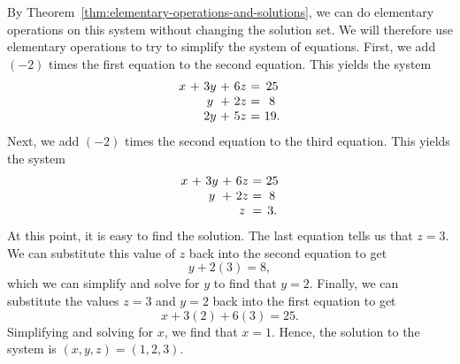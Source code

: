 \begin{solution}
  By Theorem~\ref{thm:elementary-operations-and-solutions}, we can do
  elementary operations on this system without changing the solution
  set. We will therefore use elementary operations to try to simplify
  the system of equations.  First, we add $(-2)$ times the
  first equation to the second equation. This yields the system
  \begin{equation*}
    \begin{array}{c@{~}c@{~}c@{~}c@{~}c@{~}c@{~}c}
      x&+&3y&+&6z&=&25 \\
       &&y&+&2z&=&8 \\
       &&2y&+&5z&=&19.
    \end{array}
    \label{solving-a-system2}
  \end{equation*}
  Next, we add $(-2)$ times the second equation to the
  third equation. This yields the system
  \begin{equation}\label{solving-a-system3}
    \begin{array}{c@{~}c@{~}c@{~}c@{~}c@{~}c@{~}c}
      x&+&3y&+&6z&=&25 \\
       &&y&+&2z&=&8 \\
       &&&&z&=&3.
    \end{array}
  \end{equation}
  At this point, it is easy to find the solution. The last equation
  tells us that $z=3$. We can substitute this value of $z$ back into
  the second equation to get
  \begin{equation*}
    y+2(3)=8,
  \end{equation*}
  which we can simplify and solve for $y$ to find that $y=2$. Finally,
  we can substitute the values $z=3$ and $y=2$ back into the first
  equation to get
  \begin{equation*}
    x+3(2)+6(3)=25.
  \end{equation*}
  Simplifying and solving for $x$, we find that $x=1$. Hence, the
  solution to the system is $(x,y,z)=(1,2,3)$.


\end{solution}
